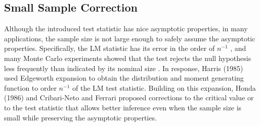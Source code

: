 \documentclass[12pt]{extarticle}
\theoremstyle{theorem}
\begin{document}

\subsection{Small Sample Correction}
Although the introduced test statistic has nice asymptotic properties, in many applications, the sample size is not large enough to safely assume the asymptotic properties. Specifically, the LM statistic has its error in the order of $n^{-1}$ \cite{harris1985asymptotic}, and many Monte Carlo experiments showed that the test rejects the null hypothesis less frequently than indicated by its nominal size \cite{honda1988size} \cite{godfrey1978testing} \cite{griffiths1986monte}. In response, Harris (1985) \cite{harris1985asymptotic} used Edgeworth expansion to obtain the distribution and moment generating function to order $n^{-1}$ of the LM test statistic. Building on this expansion, Honda (1986) \cite{honda1988size} and Cribari-Neto and Ferrari \cite{cribari1995improved} \cite{cribari2001monotonic} proposed corrections to the critical value or to the test statistic that allows better inference even when the sample size is small while preserving the asymptotic properties. 
\end{document}
